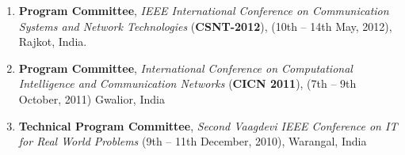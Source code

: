 \begin{enumerate} [label=(\arabic*).]
\item
\textbf{Program Committee}, \textit{IEEE International Conference on Communication Systems and Network Technologies} (\textbf{CSNT-2012}), (10th – 14th May, 2012), Rajkot, India.

\item
\textbf{Program Committee}, \textit{International Conference on Computational Intelligence and Communication Networks }(\textbf{CICN 2011}), (7th – 9th October, 2011) Gwalior, India

\item
\textbf{Technical Program Committee}, \textit{Second Vaagdevi IEEE Conference on IT for Real World Problems} (9th – 11th December, 2010), Warangal, India

\end{enumerate}